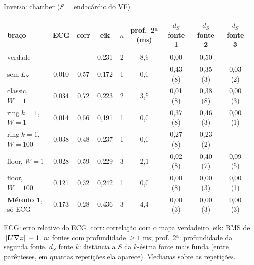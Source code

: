 \begin{frame}[label=tab_camara]{Inverso: chamber ($S$ = endocárdio do VE)}
  \centering
  \scriptsize
  \setlength{\tabcolsep}{5pt}
  \renewcommand{\arraystretch}{0.95}
  \begin{tabular}{@{}lcccccccc@{}}
    \toprule
    braço & ECG & corr & eik & $n$ & \shortstack{prof.\ 2ª\\(ms)} & \shortstack{$d_S$\\fonte 1} & \shortstack{$d_S$\\fonte 2} & \shortstack{$d_S$\\fonte 3}\\
    \midrule
    verdade & -- & -- & 0,231 & 2 & 8,9 & 0,00 & 0,50 & --\\
    sem $L_S$ & 0,010 & 0,57 & 0,172 & 1 & 0,0 & 0,43 {\tiny(8)} & 0,35 {\tiny(3)} & 0,03 {\tiny(2)}\\
    classic, $W=1$ & 0,034 & 0,72 & 0,223 & 2 & 3,5 & 0,01 {\tiny(8)} & 0,38 {\tiny(8)} & 0,00 {\tiny(3)}\\
    ring $k=1$, $W=1$ & 0,014 & 0,56 & 0,191 & 1 & 0,0 & 0,37 {\tiny(8)} & 0,46 {\tiny(3)} & 0,00 {\tiny(1)}\\
    ring $k=1$, $W=100$ & 0,038 & 0,48 & 0,237 & 1 & 0,0 & 0,27 {\tiny(8)} & 0,23 {\tiny(2)} & --\\
    floor, $W=1$ & 0,028 & 0,59 & 0,229 & 3 & 2,1 & 0,02 {\tiny(8)} & 0,40 {\tiny(7)} & 0,09 {\tiny(5)}\\
    floor, $W=100$ & 0,121 & 0,32 & 0,242 & 1 & 0,0 & 0,00 {\tiny(8)} & 0,00 {\tiny(3)} & 0,00 {\tiny(1)}\\
    \midrule
    \textbf{Método 1}, só ECG & 0,173 & 0,28 & 0,436 & 3 & 4,4 & 0,00 {\tiny(3)} & 0,00 {\tiny(3)} & 0,00 {\tiny(3)}\\
    \bottomrule
  \end{tabular}\par
  \medskip
  {\tiny ECG: erro relativo do ECG. corr: correlação com o mapa verdadeiro. eik: RMS de $\|\boldsymbol{U}\nabla\varphi\| - 1$.
  $n$: fontes com profundidade $\geq 1$ ms; prof.\ 2ª: profundidade da segunda fonte.
  $d_S$ fonte $k$: distância a $S$ da $k$-ésima fonte mais funda (entre parênteses, em quantas repetições ela aparece). Medianas sobre as repetições.}
\end{frame}

